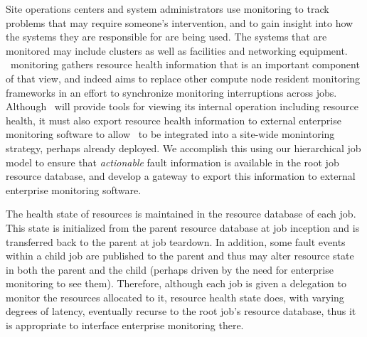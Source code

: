 \ifcomments
{}
\fi
Site operations centers and system administrators use
monitoring to track problems that may require someone's intervention, and
to gain insight into how the systems they are responsible for are being used.
The systems that are monitored may include clusters as well as facilities
and networking equipment.
\ngrm\ monitoring gathers resource health information that is an important
component of that view, and indeed aims to replace other compute node
resident monitoring frameworks in an effort to synchronize monitoring
interruptions across jobs.
Although \ngrm\ will provide tools for viewing its internal operation
including resource health, it must also export resource health information
to external enterprise monitoring software to allow \ngrm\ to be integrated
into a site-wide monintoring strategy, perhaps already deployed.
We accomplish this using our hierarchical job model to ensure that
{\em actionable} fault information is available in the root job resource
database, and develop a gateway to export this information
to external enterprise monitoring software.

The health state of resources is maintained in the resource database of
each job.
This state is initialized from the parent resource database at job inception
and is transferred back to the parent at job teardown.
In addition, some fault events within a child job are published
to the parent and thus may alter resource state in both the parent and
the child (perhaps driven by the need for enterprise monitoring to see them).
Therefore, although each job is given a delegation to monitor the resources
allocated to it, resource health state does, with varying degrees of latency,
eventually recurse to the root job's resource database, thus it is
appropriate to interface enterprise monitoring there.

